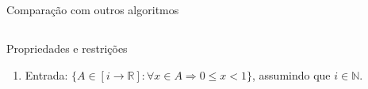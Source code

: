 \begin{frame}{Comparação com outros algoritmos}

\end{frame}




\frame{\title{\insertlecture}\maketitle}

\subsection{\insertlecture}

\begin{frame}{\insertlecture}

\begin{block}{Propriedades e restrições}

\begin{enumerate}
\item Entrada: $\{A \in [i \rightarrow \mathbb{R}] : \forall x \in A
\Rightarrow 0\leq x < 1\}$, assumindo que $i \in \mathbb{N}$.
\end{enumerate}

\end{block}

\end{frame}


